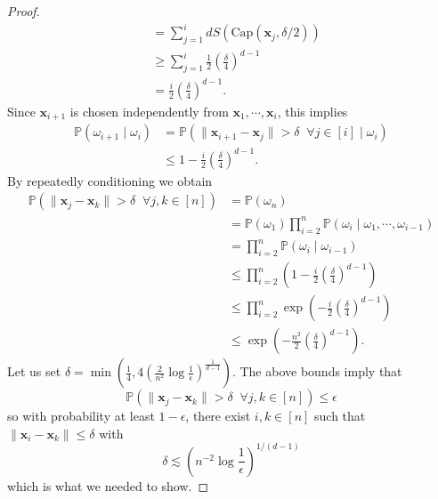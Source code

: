 \documentclass{article}
\theoremstyle{definition}
\renewcommand{\P}{\mathbb{P}}
\def\vx{{\bm{x}}}
\begin{document}
\begin{proof}
\begin{align*}
        &= \sum_{j = 1}^i dS(\text{Cap}(\vx_j, \delta/2))\\
        &\geq \sum_{j = 1}^i \frac{1}{2}\left(\frac{\delta}{4}\right)^{d - 1}\\
        &= \frac{i}{2}\left(\frac{\delta}{4}\right)^{d - 1}.
    \end{align*}
    Since $\vx_{i + 1}$ is chosen independently from $\vx_1, \cdots, \vx_i$, this implies
    \begin{align*}
        \P(\omega_{i + 1} \mid \omega_i) &= \P(\|\vx_{i + 1} - \vx_j\| > \delta \;\; \forall j \in [i] \mid \omega_i)\\
        &\leq 1 - \frac{i}{2}\left(\frac{\delta}{4}\right)^{d - 1}.
    \end{align*}
    By repeatedly conditioning we obtain
    \begin{align*}
        \P(\|\vx_j - \vx_k\| > \delta \;\; \forall j, k \in [n]) &= \P(\omega_n)\\
        &= \P(\omega_1)\prod_{i = 2}^n \P(\omega_i \mid \omega_1, \cdots, \omega_{i - 1})\\
        &= \prod_{i = 2}^n \P(\omega_i \mid \omega_{i - 1})\\
        &\leq \prod_{i = 2}^n \left(1 - \frac{i}{2}\left(\frac{\delta}{4}\right)^{d -1 }\right)\\
        &\leq \prod_{i = 2}^n \exp\left(-\frac{i}{2}\left(\frac{\delta}{4}\right)^{d - 1}\right)\\
        &\leq \exp\left(-\frac{n^2}{2}\left(\frac{\delta}{4}\right)^{d - 1}\right).
    \end{align*}
    Let us set $\delta = \min\left(\frac{1}{4}, 4\left( \frac{2}{n^2}\log \frac{1}{\epsilon} \right)^{\frac{1}{d -1 }} 
 \right)$. The above bounds imply that
 \[\P(\|\vx_j - \vx_k\| > \delta \;\; \forall j, k \in [n]) \leq \epsilon \]
 so with probability at least $1 - \epsilon$, there exist $i, k \in [n]$ such that $\|\vx_i - \vx_k\| \leq \delta$ with
 \[\delta \lesssim \left(n^{-2}\log \frac{1}{\epsilon}\right)^{1/(d - 1) } \]
 which is what we needed to show.
\end{proof}
\CorollaryUniform*
\end{document}
